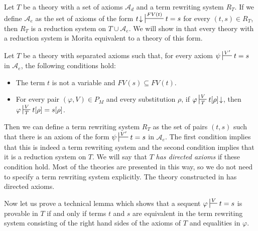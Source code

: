 \documentclass[reqno]{amsart}
\theoremstyle{definition}
\theoremstyle{remark}
\numberwithin{figure}{section}
\begin{document}
\begin{example}[dir-ax]
Let $T$ be a theory with a set of axioms $\mathcal{A}_d$ and a term rewriting system $R_T$.
If we define $\mathcal{A}_e$ as the set of axioms of the form $t\!\downarrow\ \sststile{}{FV(t)} t = s$ for every $(t,s) \in R_T$, then $R_T$ is a reduction system on $T \cup \mathcal{A}_e$.
We will show in  that every theory with a reduction system is Morita equivalent to a theory of this form.
\end{example}

Let $T$ be a theory with separated axioms such that, for every axiom $\psi \sststile{}{V'} t = s$ in $\mathcal{A}_e$, the following conditions hold:
\begin{itemize}
\item The term $t$ is not a variable and $FV(s) \subseteq FV(t)$.
\item For every pair $(\varphi,V) \in P_M$ and every substitution $\rho$, if $\varphi \sststile{T}{V} t[\rho]\!\downarrow$, then $\varphi \sststile{T}{V} t[\rho] = s[\rho]$.
\end{itemize}
Then we can define a term rewriting system $R_T$ as the set of pairs $(t,s)$ such that there is an axiom of the form $\psi \sststile{}{V'} t = s$ in $\mathcal{A}_e$.
The first condition implies that this is indeed a term rewriting system and the second condition implies that it is a reduction system on $T$.
We will say that $T$ \emph{has directed axioms} if these condition hold.
Most of the theories are presented in this way, so we do not need to specify a term rewriting system explicitly.
The theory constructed in  has directed axioms.

Now let us prove a technical lemma which shows that a sequent $\varphi \sststile{}{V} t = s$ is provable in $T$ if and only if
terms $t$ and $s$ are equivalent in the term rewriting system consisting of the right hand sides of the axioms of $T$ and equalities in $\varphi$.
\end{document}
